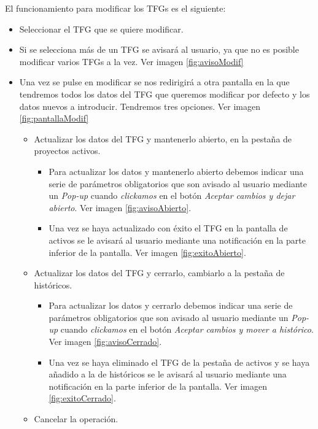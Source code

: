 
El funcionamiento para modificar los TFGs es el siguiente:
\begin{itemize}
	\item Seleccionar el TFG que se quiere modificar.
	\item Si se selecciona más de un TFG se avisará al usuario, ya que no es posible modificar varios TFGs a la vez. Ver imagen \ref{fig:avisoModif}
	\item Una vez se pulse en modificar se nos redirigirá a otra pantalla en la que tendremos todos los datos del TFG que queremos modificar por defecto y los datos nuevos a introducir. Tendremos tres opciones. Ver imagen \ref{fig:pantallaModif}
	\begin{itemize}
		\item Actualizar los datos del TFG y mantenerlo abierto, en la pestaña de proyectos activos.
		\begin{itemize}
			\item Para actualizar los datos y mantenerlo abierto debemos indicar una serie de parámetros obligatorios que son avisado al usuario mediante un \emph{Pop-up} cuando \emph{clickamos} en el botón \emph{Aceptar cambios y dejar abierto}. Ver imagen \ref{fig:avisoAbierto}.
			\item Una vez se haya actualizado con éxito el TFG en la pantalla de activos se le avisará al usuario mediante una notificación en la parte inferior de la pantalla. Ver imagen \ref{fig:exitoAbierto}.
		\end{itemize}
		\item Actualizar los datos del TFG y cerrarlo, cambiarlo a la pestaña de históricos.
		\begin{itemize}
			\item Para actualizar los datos y cerrarlo debemos indicar una serie de parámetros obligatorios que son avisado al usuario mediante un \emph{Pop-up} cuando \emph{clickamos} en el botón \emph{Aceptar cambios y mover a histórico}. Ver imagen \ref{fig:avisoCerrado}.
			\item Una vez se haya eliminado el TFG de la pestaña de activos y se haya añadido a la de históricos se le avisará al usuario mediante una notificación en la parte inferior de la pantalla. Ver imagen \ref{fig:exitoCerrado}.
		\end{itemize}
		\item Cancelar la operación.
	\end{itemize}
\end{itemize}

